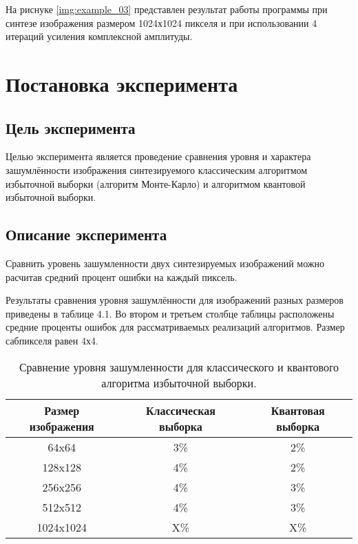 На риснуке \ref{img:example_03} представлен результат работы программы при синтезе изображения размером 1024х1024 пикселя и при использовании 4 итераций усиления комплексной амплитуды.

\section{Постановка эксперимента} 

\subsection{Цель эксперимента}

Целью эксперимента является проведение сравнения уровня и характера зашумлённости изображения синтезируемого классическим алгоритмом избыточной выборки (алгоритм Монте-Карло) и алгоритмом квантовой избыточной выборки.

\subsection{Описание эксперимента}

Сравнить уровень зашумленности двух синтезируемых изображений можно расчитав средний процент ошибки на каждый пиксель.

Результаты сравнения уровня зашумлённости для изображений разных размеров приведены в таблице 4.1. Во втором и третьем столбце таблицы расположены средние проценты ошибок для рассматриваемых реализаций алгоритмов. Размер сабпикселя равен 4х4.

\begin{table}[h!]
	\label{tab:noise}
	\caption{Сравнение уровня зашумленности для классического и квантового алгоритма избыточной выборки.}
	\begin{center}
		\begin{tabular}{|c c c|} 
			\hline
			Размер изображения & Классическая выборка & Квантовая выборка \\  
			\hline
			64x64 & 3\% & 2\%  \\
			\hline
			128x128 & 4\% & 2\% \\
			\hline
			256x256 & 4\% & 3\% \\
			\hline
			512x512 & 4\% & 3\% \\
			\hline
			1024x1024 & X\%  & X\% \\
			\hline
		\end{tabular}
	\end{center}
\end{table}

